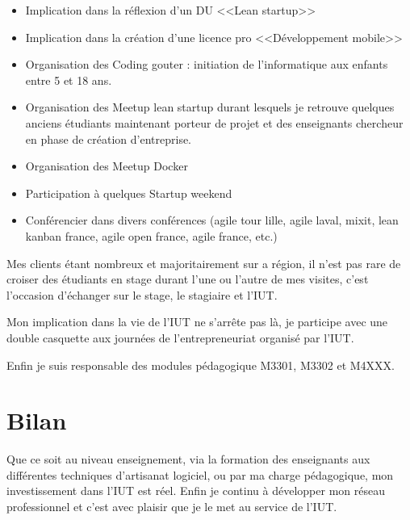 \documentclass[a4paper]{article}
\begin{document}
\begin{itemize}
  \item Implication dans la réflexion d'un DU <<Lean startup>>
  \item Implication dans la création d'une licence pro <<Développement mobile>> 
  \item Organisation des Coding gouter : initiation de l'informatique aux enfants entre 5 et 18 ans.
  \item Organisation des Meetup lean startup durant lesquels je retrouve quelques anciens étudiants maintenant porteur de projet et des enseignants chercheur en phase de création d'entreprise.
  \item Organisation des Meetup Docker
  \item Participation à quelques Startup weekend
  \item Conférencier dans divers conférences (agile tour lille, agile laval, mixit, lean kanban france, agile open france, agile france, etc.)
\end{itemize}

Mes clients étant nombreux et majoritairement sur a région, il n'est pas rare de croiser des étudiants en stage durant l'une ou l'autre de mes visites, c'est l'occasion d'échanger sur le stage, le stagiaire et l'IUT.

Mon implication dans la vie de l'IUT ne s'arrête pas là, je participe avec une double casquette aux journées de l'entrepreneuriat organisé par l'IUT.

Enfin je suis responsable des modules pédagogique M3301, M3302 et M4XXX.

\section{Bilan}

Que ce soit au niveau enseignement, via la formation des enseignants aux différentes techniques d'artisanat logiciel, ou par ma charge pédagogique, mon investissement dans l'IUT est réel. 
Enfin je continu à développer mon réseau professionnel et c'est avec plaisir que je le met au service de l'IUT.
\end{document}
